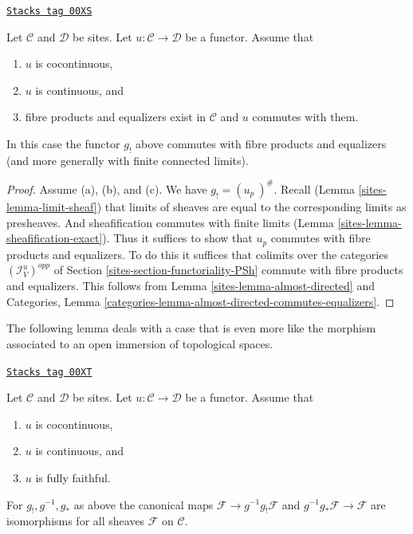\begin{lemma}
\label{sites-lemma-preserve-equalizers}
\href{https://stacks.math.columbia.edu/tag/00XS}{\texttt{Stacks tag 00XS}}

Let $\mathcal{C}$ and $\mathcal{D}$ be sites.
Let $u : \mathcal{C} \to \mathcal{D}$ be a functor.
Assume that
\begin{enumerate}
\item[(a)] $u$ is cocontinuous,
\item[(b)] $u$ is continuous, and
\item[(c)] fibre products and equalizers exist in $\mathcal{C}$ and
$u$ commutes with them.
\end{enumerate}
In this case the functor $g_!$ above commutes with fibre products and
equalizers (and more generally with finite connected limits).
\end{lemma}

\begin{proof}

Assume (a), (b), and (c).
We have $g_! = (u_p\ )^\#$. Recall (Lemma \ref{sites-lemma-limit-sheaf}) that
limits of sheaves are equal to the corresponding limits as presheaves.
And sheafification commutes with finite limits
(Lemma \ref{sites-lemma-sheafification-exact}). Thus it
suffices to show that $u_p$ commutes with fibre products and equalizers.
To do this it suffices that colimits over the categories
$(\mathcal{I}_V^u)^{opp}$ of
Section \ref{sites-section-functoriality-PSh}
commute with fibre products and equalizers. This follows
from
Lemma \ref{sites-lemma-almost-directed}
and
Categories, Lemma \ref{categories-lemma-almost-directed-commutes-equalizers}.
\end{proof}

The following lemma deals with a case that is even more like
the morphism associated to an open immersion of topological spaces.

\begin{lemma}
\label{sites-lemma-back-and-forth}
\href{https://stacks.math.columbia.edu/tag/00XT}{\texttt{Stacks tag 00XT}}

Let $\mathcal{C}$ and $\mathcal{D}$ be sites.
Let $u : \mathcal{C} \to \mathcal{D}$ be a functor.
Assume that
\begin{enumerate}
\item[(a)] $u$ is cocontinuous,
\item[(b)] $u$ is continuous, and
\item[(c)] $u$ is fully faithful.
\end{enumerate}
For $g_!, g^{-1}, g_*$ as above
the canonical maps $\mathcal{F} \to g^{-1}g_!\mathcal{F}$
and $g^{-1}g_*\mathcal{F} \to \mathcal{F}$ are isomorphisms
for all sheaves $\mathcal{F}$ on $\mathcal{C}$.
\end{lemma}

